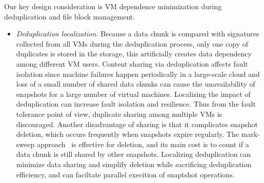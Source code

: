 Our key design consideration is VM dependence minimization during deduplication and file block management.
\begin{itemize}
\item {\em Deduplication localization.}
Because a data chunk is compared with signatures collected from all VMs during
the deduplication process, only one copy of duplicates is stored in the storage,
this artificially creates data dependency among different VM users. 
Content sharing via deduplication affects fault isolation since machine failures happen periodically 
in a large-scale cloud and
loss of a small number of shared data chunks can 
cause the unavailability of snapshots for a large number of virtual machines.
Localizing the impact of deduplication can increase fault isolation and resilience.
Thus from the fault tolerance point of view,  duplicate sharing among multiple VMs is 
discouraged. 
Another disadvantage of sharing is that it complicates snapshot deletion, 
which  occurs frequently when snapshots expire regularly. 
The mark-sweep approach~\cite{mark-sweep} is effective for deletion, and its main cost
is to count if a data chunk is still shared by other snapshots.
Localizing deduplication can  minimize data sharing and simplify deletion while sacrificing 
deduplication efficiency, and  can faciltate parallel execition of snaptshot operations.
 

\end{itemize}
